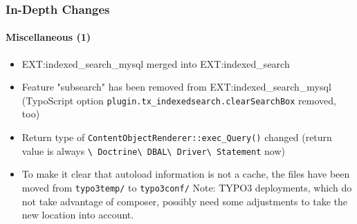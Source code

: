 
\begin{frame}[fragile]
	\frametitle{In-Depth Changes}
	\framesubtitle{Miscellaneous (1)}

	\begin{itemize}

		\item EXT:indexed\_search\_mysql merged into EXT:indexed\_search

		\item Feature "subsearch" has been removed from EXT:indexed\_search\_mysql\newline
			\smaller
				(TypoScript option \texttt{plugin.tx\_indexedsearch.clearSearchBox} removed, too)
			\normalsize

		\item Return type of \texttt{ContentObjectRenderer::exec\_Query()} changed\newline
			\smaller
				(return value is always
					\texttt{\textbackslash
						Doctrine\textbackslash
						DBAL\textbackslash
						Driver\textbackslash
						Statement}
					now)
			\normalsize

		\item To make it clear that autoload information is not a cache, the files
			have been moved from \texttt{typo3temp/} to \texttt{typo3conf/}\newline
			\smaller
				Note: TYPO3 deployments, which do not take advantage of composer, possibly
				need some adjustments to take the new location into account.
			\normalsize

	\end{itemize}

\end{frame}

